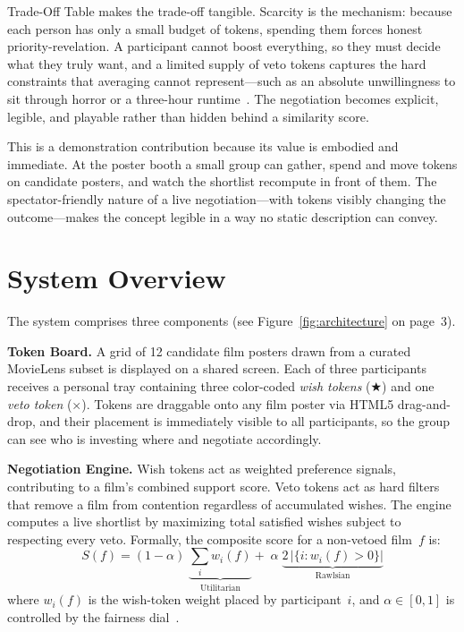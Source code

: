 \documentclass[sigconf]{acmart}
\begin{document}
Trade-Off Table makes the trade-off tangible. Scarcity is the mechanism: because each person has only a small budget of tokens, spending them forces honest priority-revelation. A participant cannot boost everything, so they must decide what they truly want, and a limited supply of veto tokens captures the hard constraints that averaging cannot represent---such as an absolute unwillingness to sit through horror or a three-hour runtime~\cite{chen2012critiquing}. The negotiation becomes explicit, legible, and playable rather than hidden behind a similarity score.

This is a demonstration contribution because its value is embodied and immediate. At the poster booth a small group can gather, spend and move tokens on candidate posters, and watch the shortlist recompute in front of them. The spectator-friendly nature of a live negotiation---with tokens visibly changing the outcome---makes the concept legible in a way no static description can convey.

\section{System Overview}
The system comprises three components (see Figure~\ref{fig:architecture} on page~3).

\textbf{Token Board.}
A grid of 12 candidate film posters drawn from a curated MovieLens subset is displayed on a shared screen. Each of three participants receives a personal tray containing three color-coded \emph{wish tokens} ($\bigstar$) and one \emph{veto token} ($\times$). Tokens are draggable onto any film poster via HTML5 drag-and-drop, and their placement is immediately visible to all participants, so the group can see who is investing where and negotiate accordingly.

\textbf{Negotiation Engine.}
Wish tokens act as weighted preference signals, contributing to a film's combined support score. Veto tokens act as hard filters that remove a film from contention regardless of accumulated wishes. The engine computes a live shortlist by maximizing total satisfied wishes subject to respecting every veto. Formally, the composite score for a non-vetoed film~$f$ is:
\[
  S(f) = (1-\alpha)\;\underbrace{\sum_{i} w_i(f)}_{\text{Utilitarian}}
       + \;\alpha\;\underbrace{2\,|\{i : w_i(f)>0\}|}_{\text{Rawlsian}}
\]
where $w_i(f)$ is the wish-token weight placed by participant~$i$, and $\alpha\in[0,1]$ is controlled by the fairness dial~\cite{baltrunas2010group}.
\end{document}
